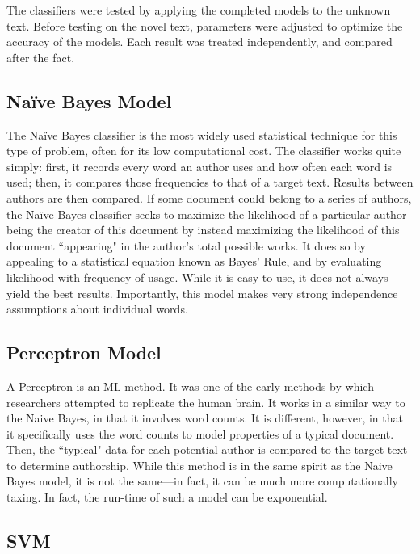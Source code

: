 \documentclass[11pt,letterpaper]{article}
\begin{document}
The classifiers were tested by applying the completed models to the unknown text. Before testing on the novel text, parameters were adjusted to optimize the accuracy of the models. Each result was treated independently, and compared after the fact. 

\subsection{Na{\"i}ve Bayes Model}

The Na{\"i}ve Bayes classifier is the most widely used statistical technique for this type of problem, often for its low computational cost. The classifier works quite simply: first, it records every word an author uses and how often each word is used; then, it compares those frequencies to that of a target text. Results between authors are then compared. If some document could belong to a series of authors, the Na{\"i}ve Bayes classifier seeks to maximize the likelihood of a particular author being the creator of this document by instead maximizing the likelihood of this document ``appearing" in the author's total possible works. It does so by appealing to a statistical equation known as Bayes' Rule, and by evaluating likelihood with frequency of usage. While it is easy to use, it does not always yield the best results. Importantly, this model makes very strong independence assumptions about individual words.

\subsection{Perceptron Model}

A Perceptron is an ML method. It was one of the early methods by which researchers attempted to replicate the human brain. It works in a similar way to the Naive Bayes, in that it involves word counts. It is different, however, in that it specifically uses the word counts to model properties of a typical document. Then, the ``typical" data for each potential author is compared to the target text to determine authorship. While this method is in the same spirit as the Naive Bayes model, it is not the same---in fact, it can be much more computationally taxing. In fact, the run-time of such a model can be exponential.

\subsection{SVM}
\end{document}
